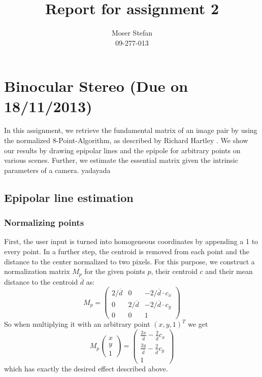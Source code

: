 \documentclass{paper}
\title{Report for assignment 2}
\author{Moser Stefan\\09-277-013}
\begin{document}
\maketitle

\section{Binocular Stereo (Due on 18/11/2013)}

In this assignment, we retrieve the fundamental matrix of an image pair by using the normalized 8-Point-Algorithm, as described by Richard Hartley \cite{601246}. We show our results by drawing epipolar lines and the epipole for arbitrary points on various scenes. Further, we estimate the essential matrix given the intrinsic parameters of a camera. yadayada

\subsection{Epipolar line estimation}

\subsubsection{Normalizing points}

First, the user input is turned into homogeneous coordinates by appending a 1 to every point. 
In a further step, the centroid is removed from each point and the distance to the center normalized to two pixels. For this purpose, we construct a normalization matrix $M_p$ for the given points $p$, their centroid $c$ and their mean distance to the centroid $\overline{d}$ as:
\begin{equation}
M_p =
\begin{pmatrix}
	2/\overline{d} & 0 & -2/\overline{d} \cdot c_x \\
	0 & 2/\overline{d} & -2/\overline{d} \cdot c_y \\
	0 & 0 & 1
\end{pmatrix}
\end{equation}
So when multiplying it with an arbitrary point $(x,y,1)^T$ we get
\begin{equation}
M_p \begin{pmatrix}
 x \\
 y \\
 1
\end{pmatrix}
 = \begin{pmatrix}
 	\frac{2x}{\overline{d}} - \frac{2}{\overline{d}}c_x \\
 	\frac{2y}{\overline{d}} - \frac{2}{\overline{d}}c_y \\
 	1
 \end{pmatrix}
\end{equation}
which has exactly the desired effect described above.
\end{document}
